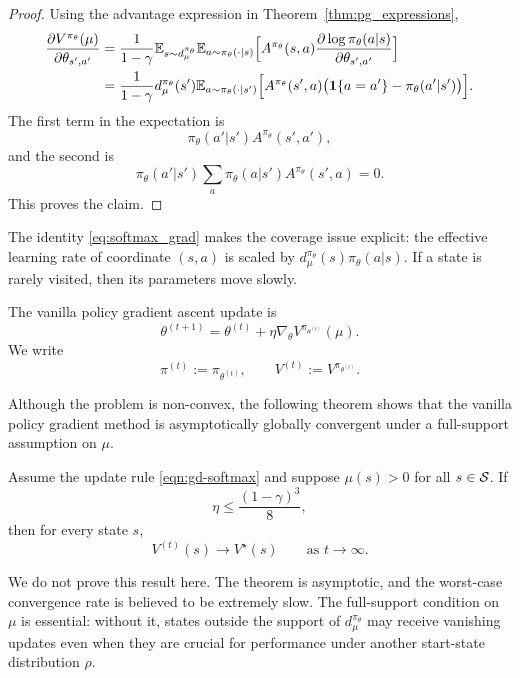 \begin{proof}
Using the advantage expression in Theorem~\ref{thm:pg_expressions},
\begin{align*}
\frac{\partial V^{\pi_\theta}(\mu)}{\partial \theta_{s',a'}}
&=
\frac{1}{1-\gamma}
\mathbb{E}_{s\sim d_\mu^{\pi_\theta}}
\mathbb{E}_{a\sim \pi_\theta(\cdot|s)}
\Big[
A^{\pi_\theta}(s,a)
\frac{\partial \log \pi_\theta(a|s)}{\partial \theta_{s',a'}}
\Big] \\
&=
\frac{1}{1-\gamma}
d_\mu^{\pi_\theta}(s')
\mathbb{E}_{a\sim \pi_\theta(\cdot|s')}
\Big[
A^{\pi_\theta}(s',a)
\big(\mathbf{1}\{a=a'\}-\pi_\theta(a'|s')\big)
\Big].
\end{align*}
The first term in the expectation is
\[
\pi_\theta(a'|s')A^{\pi_\theta}(s',a'),
\]
and the second is
\[
\pi_\theta(a'|s')\sum_a \pi_\theta(a|s')A^{\pi_\theta}(s',a)=0.
\]
This proves the claim.
\end{proof}

The identity \eqref{eq:softmax_grad} makes the coverage issue explicit:
the effective learning rate of coordinate $(s,a)$ is scaled by
$d_\mu^{\pi_\theta}(s)\pi_\theta(a|s)$.
If a state is rarely visited, then its parameters move slowly.

The vanilla policy gradient ascent update is
\begin{equation}\label{eqn:gd-softmax}
\theta^{(t+1)}=\theta^{(t)}+\eta \nabla_\theta V^{\pi_{\theta^{(t)}}}(\mu).
\end{equation}
We write
\[
\pi^{(t)}:=\pi_{\theta^{(t)}},
\qquad
V^{(t)}:=V^{\pi_{\theta^{(t)}}}.
\]

Although the problem is non-convex, the following theorem shows that the vanilla policy
gradient method is asymptotically globally convergent under a full-support assumption on $\mu$.

\begin{theorem}
\label{thm:glb-softmax}
Assume the update rule \eqref{eqn:gd-softmax} and suppose $\mu(s)>0$ for all
$s\in\mathcal{S}$. If
\[
\eta \le \frac{(1-\gamma)^3}{8},
\]
then for every state $s$,
\[
V^{(t)}(s)\to V^\star(s)
\qquad \text{as } t\to\infty.
\]
\end{theorem}

We do not prove this result here. The theorem is asymptotic, and the worst-case convergence
rate is believed to be extremely slow. The full-support condition on $\mu$ is essential:
without it, states outside the support of $d_\mu^{\pi_\theta}$ may receive vanishing updates
even when they are crucial for performance under another start-state distribution $\rho$.

